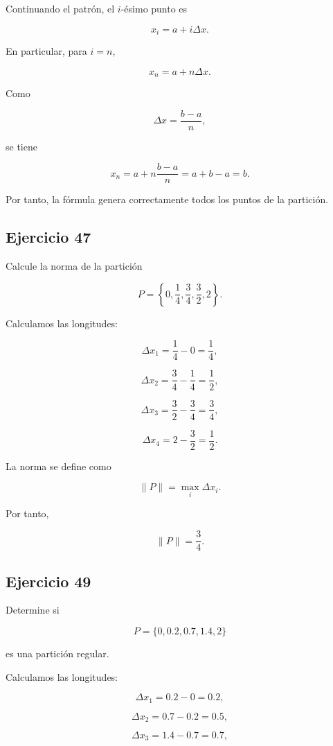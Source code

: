 \documentclass[12pt]{article}
\begin{document}
Continuando el patrón, el \(i\)-ésimo punto es

\[
\boxed{
x_i=a+i\Delta x
}.
\]

En particular, para \(i=n\),

\[
x_n=a+n\Delta x.
\]

Como

\[
\Delta x=\frac{b-a}{n},
\]

se tiene

\[
x_n
=
a+n\frac{b-a}{n}
=
a+b-a
=
b.
\]

Por tanto, la fórmula genera correctamente todos los puntos de la
partición.

\subsection*{Ejercicio 47}

Calcule la norma de la partición

\[
P=
\left\{
0,\frac14,\frac34,\frac32,2
\right\}.
\]

Calculamos las longitudes:

\[
\Delta x_1
=
\frac14-0
=
\frac14,
\]

\[
\Delta x_2
=
\frac34-\frac14
=
\frac12,
\]

\[
\Delta x_3
=
\frac32-\frac34
=
\frac34,
\]

\[
\Delta x_4
=
2-\frac32
=
\frac12.
\]

La norma se define como

\[
\|P\|
=
\max_i\Delta x_i.
\]

Por tanto,

\[
\boxed{
\|P\|=\frac34
}.
\]

\subsection*{Ejercicio 49}

Determine si

\[
P=\{0,0.2,0.7,1.4,2\}
\]

es una partición regular.

Calculamos las longitudes:

\[
\Delta x_1=0.2-0=0.2,
\]

\[
\Delta x_2=0.7-0.2=0.5,
\]

\[
\Delta x_3=1.4-0.7=0.7,
\]
\end{document}
